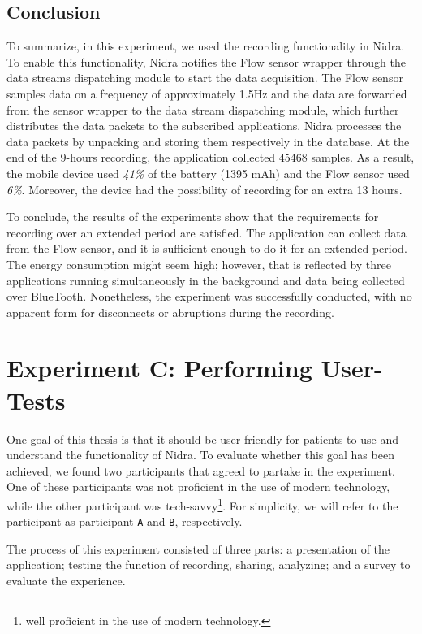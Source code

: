 \subsection{Conclusion}
To summarize, in this experiment, we used the recording functionality in Nidra. To enable this functionality, Nidra notifies the Flow sensor wrapper through the data streams dispatching module to start the data acquisition. The Flow sensor samples data on a frequency of approximately 1.5Hz and the data are forwarded from the sensor wrapper to the data stream dispatching module, which further distributes the data packets to the subscribed applications. Nidra processes the data packets by unpacking and storing them respectively in the database. At the end of the 9-hours recording, the application collected 45468 samples. As a result, the mobile device used \textit{41\%} of the battery (1395 mAh) and the Flow sensor used \textit{6\%}. Moreover, the device had the possibility of recording for an extra 13 hours.

To conclude, the results of the experiments show that the requirements for recording over an extended period are satisfied. The application can collect data from the Flow sensor, and it is sufficient enough to do it for an extended period. The energy consumption might seem high; however, that is reflected by three applications running simultaneously in the background and data being collected over BlueTooth. Nonetheless, the experiment was successfully conducted, with no apparent form for disconnects or abruptions during the recording. 

\section{Experiment C: Performing User-Tests}
One goal of this thesis is that it should be user-friendly for patients to use and understand the functionality of Nidra. To evaluate whether this goal has been achieved, we found two participants that agreed to partake in the experiment. One of these participants was not proficient in the use of modern technology, while the other participant was tech-savvy\footnote{well proficient in the use of modern technology.}. For simplicity, we will refer to the participant as participant \verb|A| and \verb|B|, respectively. 

The process of this experiment consisted of three parts: a presentation of the application; testing the function of recording, sharing, analyzing; and a survey to evaluate the experience. 

